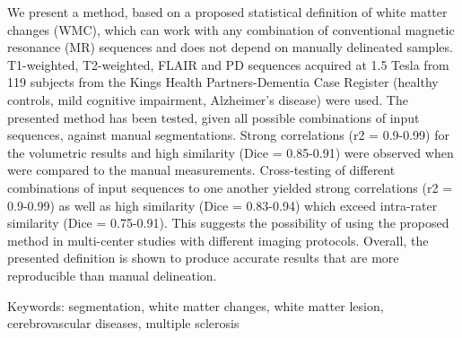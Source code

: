 We present a method, based on a proposed statistical definition of white matter changes (WMC), which can work with any combination of conventional magnetic resonance (MR) sequences and does not depend on manually delineated samples. T1-weighted, T2-weighted, FLAIR and PD sequences acquired at 1.5 Tesla from 119 subjects from the Kings Health Partners-Dementia Case Register (healthy controls, mild cognitive impairment, Alzheimer’s disease) were used. The presented method has been tested, given all possible combinations of input sequences, against manual segmentations. Strong correlations (r2 = 0.9-0.99) for the volumetric results and high similarity (Dice = 0.85-0.91) were observed when were compared to the manual measurements. Cross-testing of different combinations of input sequences to one another yielded strong correlations (r2 = 0.9-0.99) as well as high similarity (Dice = 0.83-0.94) which exceed intra-rater similarity (Dice = 0.75-0.91). This suggests the possibility of using the proposed method in multi-center studies with different imaging protocols.
Overall, the presented definition is shown to produce accurate results that are more reproducible than manual delineation.

Keywords: segmentation, white matter changes, white matter lesion, cerebrovascular diseases, multiple sclerosis
